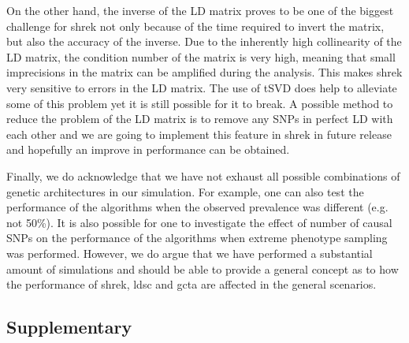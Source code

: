 	On the other hand, the inverse of the \gls{LD} matrix proves to be one of the biggest challenge for \gls{shrek} not only because of the time required to invert the matrix, but also the accuracy of the inverse.
	Due to the inherently high collinearity of the \gls{LD} matrix, the condition number of the matrix is very high, meaning that small imprecisions in the matrix can be amplified during the analysis. 
	This makes \gls{shrek} very sensitive to errors in the \gls{LD} matrix. 
	The use of \gls{tSVD} does help to alleviate some of this problem yet it is still possible for it to break.
	A possible method to reduce the problem of the \gls{LD} matrix is to remove any \glspl{SNP} in perfect \gls{LD} with each other and we are going to implement this feature in \gls{shrek} in future release and hopefully an improve in performance can be obtained.  
	
	Finally, we do acknowledge that we have not exhaust all possible combinations of genetic architectures in our simulation.
	For example, one can also test the performance of the algorithms when the observed prevalence was different (e.g. not 50\%).
	It is also possible for one to investigate the effect of number of causal \glspl{SNP} on the performance of the algorithms when extreme phenotype sampling was performed.
	However, we do argue that we have performed a substantial amount of simulations and should be able to provide a general concept as to how the performance of \gls{shrek}, \gls{ldsc} and \gls{gcta} are affected in the general scenarios.
	
	\newpage
	
\begin{singlespace}
\section{Supplementary}



\end{singlespace}
	